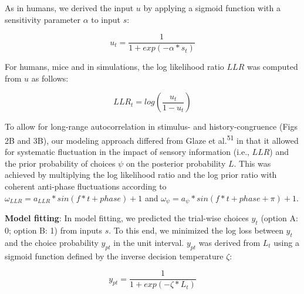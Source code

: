 \documentclass[
]{article}
\begin{document}
As in humans, we derived the input \(u\) by applying a sigmoid function
with a sensitivity parameter \(\alpha\) to input \(s\):

\begin{equation}
u_t = \frac{1}{1 + exp(-\alpha * s_t)}
\end{equation}

For humans, mice and in simulations, the log likelihood ratio \(LLR\)
was computed from \(u\) as follows:

\begin{equation}
LLR_t = log(\frac{u_t}{1-u_t})
\end{equation}

To allow for long-range autocorrelation in stimulus- and
history-congruence (Figs 2B and 3B), our modeling approach differed
from Glaze et al.\textsuperscript{51} in that it allowed for systematic
fluctuation in the impact of sensory information (i.e., \(LLR\)) and the
prior probability of choices \(\psi\) on the posterior probability
\(L\). This was achieved by multiplying the log likelihood ratio and the
log prior ratio with coherent anti-phase fluctuations according to
\(\omega_{LLR} = a_{LLR} * sin(f * t + phase) + 1\) and
\(\omega_{\psi} = a_{\psi} * sin(f * t + phase + \pi) + 1\).

\textbf{Model fitting}: In model fitting, we predicted the trial-wise
choices \(y_t\) (option A: 0; option B: 1) from inputs \(s\). To this
end, we minimized the log loss between \(y_t\) and the choice
probability \(y_{p t}\) in the unit interval. \(y_{p t}\) was derived
from \(L_t\) using a sigmoid function defined by the inverse decision
temperature \(\zeta\):

\begin{equation}
y_{p t} = \frac{1}{1 + exp(-\zeta * L_t)}
\end{equation}
\end{document}
